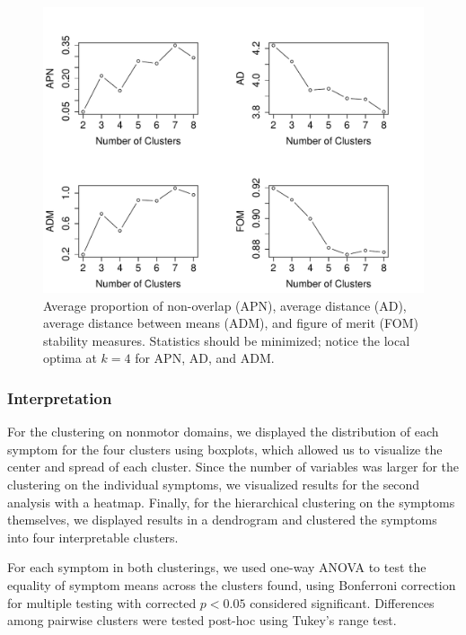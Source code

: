 \documentclass[preprint,3p,twocolumn]{elsarticle} %
\begin{document}
\begin{figure}[h]
  \centering
  \includegraphics[width=\linewidth]{stability-measures.pdf}
  \caption{Average proportion of non-overlap (APN), average distance (AD), average distance
    between means (ADM), and figure of merit (FOM) stability measures\cite{datta2006methods,
    yeung2001validating}. Statistics should be minimized; notice the local optima at $k = 4$ for
  APN, AD, and ADM.}
  \label{fig:stability}
\end{figure}

\subsubsection{Interpretation}

For the clustering on nonmotor domains, we displayed the distribution of each symptom for the four
clusters using boxplots, which allowed us to visualize the center and spread of each cluster. Since
the number of variables was larger for the clustering on the individual symptoms, we visualized
results for the second analysis with a heatmap. Finally, for the hierarchical clustering on the
symptoms themselves, we displayed results in a dendrogram and clustered the symptoms into four
interpretable clusters.

For each symptom in both clusterings, we used one-way ANOVA to test the equality of symptom means
across the clusters found, using Bonferroni correction for multiple testing with corrected $p <
0.05$ considered significant. Differences among pairwise clusters were tested post-hoc using
Tukey's range test.
\end{document}
